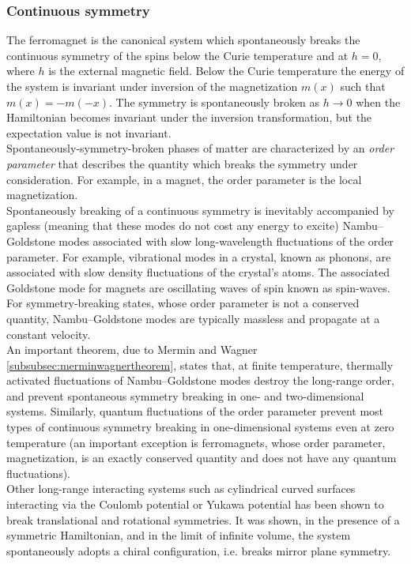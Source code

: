 \subsubsection{Continuous symmetry}
The ferromagnet is the canonical system which spontaneously breaks the continuous symmetry of the spins below the Curie temperature and at $h = 0$, where $h$ is the external magnetic field. Below the Curie temperature the energy of the system is invariant under inversion of the magnetization $m(x)$ such that $m(x) = −m(−x)$. The symmetry is spontaneously broken as $h \rightarrow 0$ when the Hamiltonian becomes invariant under the inversion transformation, but the expectation value is not invariant.\\
Spontaneously-symmetry-broken phases of matter are characterized by an \emph{order parameter}  that describes the quantity which breaks the symmetry under consideration. For example, in a magnet, the order parameter is the local magnetization.\\
Spontaneously breaking of a continuous symmetry is inevitably accompanied by gapless (meaning that these modes do not cost any energy to excite) Nambu–Goldstone modes associated with slow long-wavelength fluctuations of the order parameter. For example, vibrational modes in a crystal, known as phonons, are associated with slow density fluctuations of the crystal's atoms. The associated Goldstone mode for magnets are oscillating waves of spin known as spin-waves. For symmetry-breaking states, whose order parameter is not a conserved quantity, Nambu–Goldstone modes are typically massless and propagate at a constant velocity.\\
An important theorem, due to Mermin and Wagner \ref{subsubsec:merminwagnertheorem}, states that, at finite temperature, thermally activated fluctuations of Nambu–Goldstone modes destroy the long-range order, and prevent spontaneous symmetry breaking in one- and two-dimensional systems. Similarly, quantum fluctuations of the order parameter prevent most types of continuous symmetry breaking in one-dimensional systems even at zero temperature (an important exception is ferromagnets, whose order parameter, magnetization, is an exactly conserved quantity and does not have any quantum fluctuations).\\
Other long-range interacting systems such as cylindrical curved surfaces interacting via the Coulomb potential or Yukawa potential has been shown to break translational and rotational symmetries. It was shown, in the presence of a symmetric Hamiltonian, and in the limit of infinite volume, the system spontaneously adopts a chiral configuration, i.e. breaks mirror plane symmetry.
